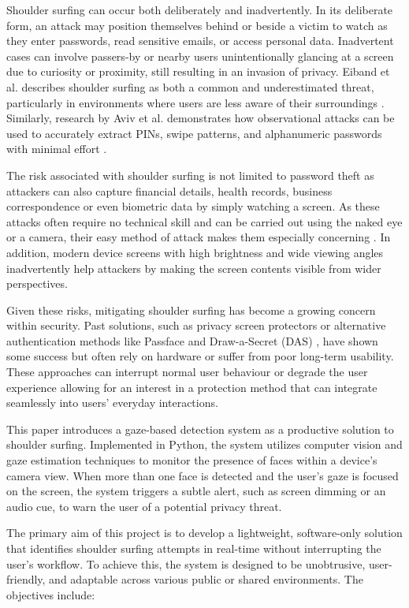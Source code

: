 \documentclass[12pt]{article}
\theoremstyle{plain}
\theoremstyle{definition}
\begin{document}
Shoulder surfing can occur both deliberately and inadvertently. In its deliberate form, an attack may position themselves behind or beside a victim to watch as they enter passwords, read sensitive emails, or access personal data. Inadvertent cases can involve passers-by or nearby users unintentionally glancing at a screen due to curiosity or proximity, still resulting in an invasion of privacy. Eiband et al. describes shoulder surfing as both a common and underestimated threat, particularly in environments where users are less aware of their surroundings \cite{eiband_understanding_2017}. Similarly, research by Aviv et al. demonstrates how observational attacks can be used to accurately extract PINs, swipe patterns, and alphanumeric passwords with minimal effort \cite{aviv_towards_2017}.

The risk associated with shoulder surfing is not limited to password theft as attackers can also capture financial details, health records, business correspondence or even biometric data by simply watching a screen. As these attacks often require no technical skill and can be carried out using the naked eye or a camera, their easy method of attack makes them especially concerning \cite{block_impact_2010}. In addition, modern device screens with high brightness and wide viewing angles inadvertently help attackers by making the screen contents visible from wider perspectives.

Given these risks, mitigating shoulder surfing has become a growing concern within security. Past solutions, such as privacy screen protectors or alternative authentication methods like Passface \cite{liu_passface_2021} and Draw-a-Secret (DAS) \cite{nali_analyzing_2004}, have shown some success but often rely on hardware or suffer from poor long-term usability. These approaches can interrupt normal user behaviour or degrade the user experience allowing for an interest in a protection method that can integrate seamlessly into users’ everyday interactions.

This paper introduces a gaze-based detection system as a productive solution to shoulder surfing. Implemented in Python, the system utilizes computer vision and gaze estimation techniques to monitor the presence of faces within a device’s camera view. When more than one face is detected and the user’s gaze is focused on the screen, the system triggers a subtle alert, such as screen dimming or an audio cue, to warn the user of a potential privacy threat.

The primary aim of this project is to develop a lightweight, software-only solution that identifies shoulder surfing attempts in real-time without interrupting the user’s workflow. To achieve this, the system is designed to be unobtrusive, user-friendly, and adaptable across various public or shared environments. The objectives include:
\end{document}
